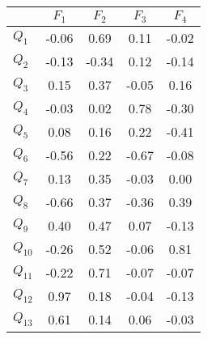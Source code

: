\begin{tabular}{|l|c|c|c|c|}
\hline
&\textbf{$F_{1}$}&\textbf{$F_{2}$}&\textbf{$F_{3}$}&\textbf{$F_{4}$}\\\hline
\textbf{$Q_{1}$}&-0.06&0.69&0.11&-0.02\\\hline
\textbf{$Q_{2}$}&-0.13&-0.34&0.12&-0.14\\\hline
\textbf{$Q_{3}$}&0.15&0.37&-0.05&0.16\\\hline
\textbf{$Q_{4}$}&-0.03&0.02&0.78&-0.30\\\hline
\textbf{$Q_{5}$}&0.08&0.16&0.22&-0.41\\\hline
\textbf{$Q_{6}$}&-0.56&0.22&-0.67&-0.08\\\hline
\textbf{$Q_{7}$}&0.13&0.35&-0.03&0.00\\\hline
\textbf{$Q_{8}$}&-0.66&0.37&-0.36&0.39\\\hline
\textbf{$Q_{9}$}&0.40&0.47&0.07&-0.13\\\hline
\textbf{$Q_{10}$}&-0.26&0.52&-0.06&0.81\\\hline
\textbf{$Q_{11}$}&-0.22&0.71&-0.07&-0.07\\\hline
\textbf{$Q_{12}$}&0.97&0.18&-0.04&-0.13\\\hline
\textbf{$Q_{13}$}&0.61&0.14&0.06&-0.03\\\hline
\end{tabular}
